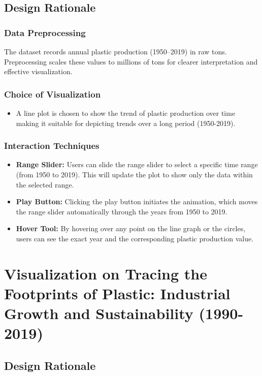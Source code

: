 \documentclass{article}
\begin{document}
\subsection{Design Rationale}

\subsubsection{Data Preprocessing}
The dataset records annual plastic production (1950–2019) in raw tons. Preprocessing scales these values to millions of tons for clearer interpretation and effective visualization.

\subsubsection{Choice of Visualization}
\begin{itemize}
    \item A line plot is chosen to show the trend of plastic production over time making it suitable for depicting trends over a long period (1950-2019).
\end{itemize}

\subsubsection{Interaction Techniques}
\begin{itemize}
    \item \textbf{Range Slider:} Users can slide the range slider to select a specific time range (from 1950 to 2019). This will update the plot to show only the data within the selected range.
    \item \textbf{Play Button:} Clicking the play button initiates the animation, which moves the range slider automatically through the years from 1950 to 2019.
    \item \textbf{Hover Tool:} By hovering over any point on the line graph or the circles, users can see the exact year and the corresponding plastic production value.
\end{itemize}

\section{Visualization on Tracing the Footprints of Plastic: Industrial Growth and Sustainability (1990-2019)}

\subsection{Design Rationale}
\end{document}
